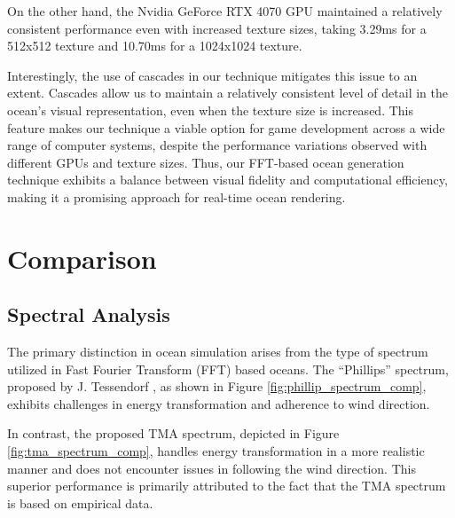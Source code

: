 On the other hand, the Nvidia GeForce RTX 4070 GPU maintained a relatively consistent performance even with increased texture sizes, taking 3.29ms for a 512x512 texture and 10.70ms for a 1024x1024 texture.

Interestingly, the use of cascades in our technique mitigates this issue to an extent. Cascades allow us to maintain a relatively consistent level of detail in the ocean’s visual representation, even when the texture size is increased. This feature makes our technique a viable option for game development across a wide range of computer systems, despite the performance variations observed with different GPUs and texture sizes. Thus, our FFT-based ocean generation technique exhibits a balance between visual fidelity and computational efficiency, making it a promising approach for real-time ocean rendering.


\section{Comparison} 

\subsection{Spectral Analysis} 
The primary distinction in ocean simulation arises from the type of spectrum utilized in Fast Fourier Transform (FFT) based oceans. The “Phillips” spectrum, proposed by J. Tessendorf \cite{tessendorf2001}, as shown in Figure \ref{fig:phillip_spectrum_comp}, exhibits challenges in energy transformation and adherence to wind direction.

In contrast, the proposed TMA spectrum, depicted in Figure \ref{fig:tma_spectrum_comp}, handles energy transformation in a more realistic manner and does not encounter issues in following the wind direction. This superior performance is primarily attributed to the fact that the TMA spectrum is based on empirical data.

